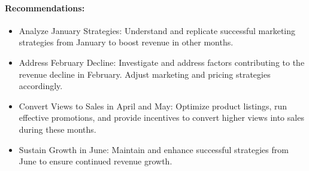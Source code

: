 \documentclass[
]{article}
\providecommand{\tightlist}{%
  \setlength{\itemsep}{0pt}\setlength{\parskip}{0pt}}
\begin{document}
\paragraph{Recommendations:}\label{recommendations}

\begin{itemize}
\tightlist
\item
  Analyze January Strategies: Understand and replicate successful
  marketing strategies from January to boost revenue in other months.
\item
  Address February Decline: Investigate and address factors contributing
  to the revenue decline in February. Adjust marketing and pricing
  strategies accordingly.
\item
  Convert Views to Sales in April and May: Optimize product listings,
  run effective promotions, and provide incentives to convert higher
  views into sales during these months.
\item
  Sustain Growth in June: Maintain and enhance successful strategies
  from June to ensure continued revenue growth.
\end{itemize}
\end{document}
